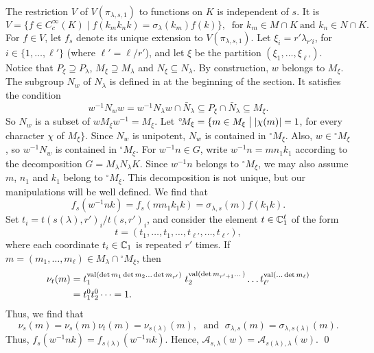 \documentclass{amsart}
\begin{document}
The restriction $V$ of 
  $V(\pi_{\lambda,s,1})$
to functions on $K$ is independent of $s$.
It is
%
$$
  V =
  \{
    f \in C_c^{\infty} (K) \mid
    f (k_m k_n k ) =
    \sigma_{\lambda} (k_m) f (k)
  \}, \ \text{ for } k_m\in M\cap K
  \ \text{and } k_n\in N\cap K.
$$
%
For
  $ f \in V $,
let 
  $ f_s $
denote its unique extension to
  $ V(\pi_{\lambda,s,1} ) $.
Let
  $ \xi_i = r'\lambda_{r'i} $,
for
  $i\in \{1,\dots,\ell'\}$ (where $\ell'=\ell/r'$),
and let
  $ \xi $
be the partition 
  $ ( \xi_1, \dots, \xi_{\ell'}) $.
Notice that
  $ P_{\xi} \supseteq P_{\lambda} $,
  $ M_{\xi} \supseteq M_{\lambda} $ and
  $ N_{\xi} \subseteq N_{\lambda} $.
By construction,
  $ w$ belongs to $M_{\xi} $.
  The subgroup $N_w$ of $N_\lambda$ is defined in
  at the beginning of the section.  It satisfies the condition
%
$$
  w^{-1} N_w w = 
  w^{-1} N_\lambda w \cap \bar N_\lambda \subseteq 
  P_{\xi} \cap \bar N_\lambda \subseteq
  M_{\xi}.
$$
%
So
  $ N_w $ is a subset of $ w M_{\xi} w^{-1} = M_{\xi} $.
Let 
  $ {}^{\circ}\! M_{\xi} = 
    \{ m \in M_{\xi} \bigm|
       |\chi(m)| = 1 $,
for every character
  $ \chi $
of 
  $ M_{\xi} \} $.
Since
  $ N_w $
is unipotent,
  $ N_w$ is contained in  
    ${}^{\circ} \!M_{\xi} $.
Also,
  $ w \in 
    {}^{\circ} \!M_{\xi} $,
so
  $ w^{-1} N_w$ is contained in 
    ${}^{\circ} \!M_{\xi} $.
For
  $ w^{-1} n \in G $,
write
  $ w^{-1} n = m n_1 k_1 $
according to the decomposition
  $ G = M_{\lambda} N_{\lambda} K $.
Since
  $ w^{-1} n$ belongs to  ${}^{\circ} \!M_{\xi} $,
we may also assume
  $m$, $n_1$ and $k_1$ belong to
    ${}^{\circ} \!M_{\xi} $.
This decomposition is not unique, but our manipulations
  will be well defined.  We find that
%
$$
  f_s (w^{-1}nk) =
  f_s (m n_1 k_1 k) =
  \sigma_{\lambda,s}(m) f (k_1 k).
$$
%
Set $t_i = t(s(\lambda),r')_i/t(s,r')_i$, and
consider the element $t\in {\Bbb C}^\ell_1$ of the form
$$t = (t_1,\ldots,t_1,\ldots ,t_{\ell'},\ldots,t_{\ell'}),$$ where
each coordinate $t_i\in{\Bbb C}_1$ is repeated $r'$ times.
If $m=(m_1,\ldots,m_\ell)\in M_\lambda \cap {}^{\circ}\!M_\xi$,
then
\begin{align*}
 \nu_t (m) &=
   t_1^{%
      \operatorname{val}
      (\det m_1 \det m_2 \dots \det m_{r'}) } \;
   t_2^{%
      \operatorname{val}
      (\det m_{r'+1} \dots) }
    \dots
    t_{\ell'}^{%
      \operatorname{val}(\dots \det m_\ell)}
\\
\vspace{4pt}
  &=
   t_1^0
   t_2^0 \dots = 1.
\end{align*}
%
Thus, we find that
%
$$
  \nu_s (m) =
  \nu_s (m)
  \nu_t(m) =
  \nu_{s(\lambda)} (m), \; \text{ and } \;
  \sigma_{\lambda,s} (m) =
  \sigma_{\lambda,s(\lambda)} (m).
$$
%
Thus,
  $ f_s (w^{-1} nk) =
    f_{s(\lambda)} (w^{-1} nk) $.
Hence, 
  $\mathcal A_{s, \lambda} (w) =
   \mathcal A_{s(\lambda), \lambda} (w) $.
%
\qed\finishpproclaim
\end{document}
